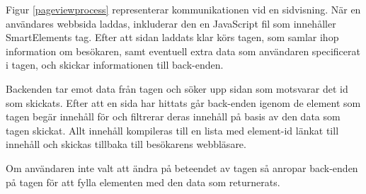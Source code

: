Figur \ref{pageviewprocess} representerar kommunikationen vid en sidvisning. När en användares webbsida laddas, inkluderar den en JavaScript fil som innehåller SmartElements tag. Efter att sidan laddats klar körs tagen, som samlar ihop information om besökaren, samt eventuell extra data som användaren specificerat i tagen, och skickar informationen till back-enden.

Backenden tar emot data från tagen och söker upp sidan som motsvarar det id som skickats. Efter att en sida har hittats går back-enden igenom de element som tagen begär innehåll för och filtrerar deras innehåll på basis av den data som tagen skickat. Allt innehåll kompileras till en lista med element-id länkat till innehåll och skickas tillbaka till besökarens webbläsare.

Om användaren inte valt att ändra på beteendet av tagen så anropar back-enden på tagen för att fylla elementen med den data som returnerats.